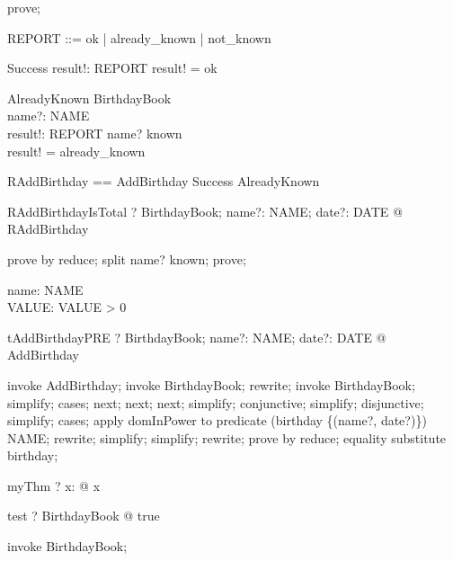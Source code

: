 \begin{zproof}
prove;
\end{zproof}

\begin{zed}
REPORT ::= ok | already\_known | not\_known
\end{zed}

\begin{schema}{Success}
  result!: REPORT
\where
  result! = ok
\end{schema}

\begin{schema}{AlreadyKnown}
  \Xi BirthdayBook\\
  name?: NAME\\
  result!: REPORT
\where
  name? \in  known\\
  result! = already\_known
\end{schema}

\begin{zed}
RAddBirthday == AddBirthday \land  Success \lor  AlreadyKnown
\end{zed}

\begin{theorem}{RAddBirthdayIsTotal}
\vdash? \forall  BirthdayBook; name?: NAME; date?: DATE @ \pre  RAddBirthday
\end{theorem}

\begin{zproof}[RAddBirthdayIsTotal]
prove by reduce;
split name? \in  known;
prove;
\end{zproof}

\begin{axdef}
  name: NAME\\
  VALUE: \nat
\where
  VALUE > 0
\end{axdef}

\begin{theorem}{tAddBirthdayPRE}
\vdash? \forall  BirthdayBook; name?: NAME; date?: DATE @ \pre  AddBirthday
\end{theorem}

\begin{zproof}[tAddBirthdayPRE]
invoke AddBirthday;
invoke \Delta BirthdayBook;
rewrite;
invoke BirthdayBook;
simplify;
cases;
next;
next;
next;
simplify;
conjunctive;
simplify;
disjunctive;
simplify;
cases;
apply domInPower to predicate \dom  (birthday \cup  \{(name?, date?)\}) \in  \power  NAME;
rewrite;
simplify;
simplify;
rewrite;
prove by reduce;
equality substitute \dom  birthday;
\end{zproof}

\begin{theorem}{myThm}
\vdash? \forall  x: \nat  @ x 
\end{theorem}

\begin{theorem}{test}
\vdash? \forall BirthdayBook @ true
\end{theorem}

\begin{zproof}[test]
invoke BirthdayBook;
\end{zproof}

